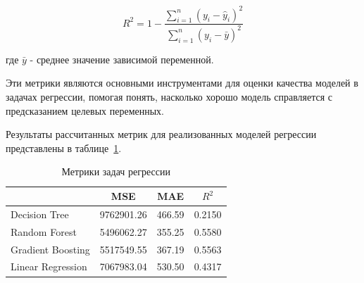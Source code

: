 \[ 
R^2 = 1 - \frac{\sum_{i=1}^{n} (y_i - \hat{y}_i)^2}{\sum_{i=1}^{n} (y_i - \bar{y})^2} 
\]

где \( \bar{y} \) - среднее значение зависимой переменной. 

\vspace{1.5em}

Эти метрики являются основными инструментами для оценки качества моделей в задачах регрессии, помогая понять, насколько хорошо модель справляется с предсказанием целевых переменных.

Результаты рассчитанных метрик для реализованных моделей регрессии представлены в таблице~\ref{tabular:table-classification}.

\begin{table}[H]
    \onehalfspacing \caption{Метрики задач регрессии}
    \medskip
        \begin{tabular}{|l|c|c|c|}
        \hline
            \backslashbox{}{}  & MSE & MAE & $R^2$ \\ \hline
            Decision Tree & 9762901.26 & 466.59 & 0.2150 \\  \hline 
            Random Forest & 5496062.27 & 355.25 & 0.5580 \\  \hline 
            Gradient Boosting & 5517549.55 & 367.19 & 0.5563 \\  \hline 
            Linear Regression & 7067983.04 & 530.50 &  0.4317 \\  \hline 
        \end{tabular}
    \label{tabular:table-classification}
\end{table}